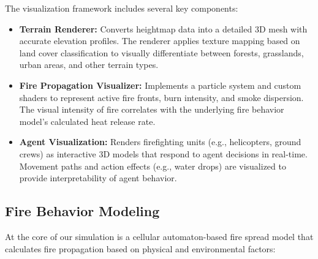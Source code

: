 \documentclass[conference]{IEEEtran}
\begin{document}
\noindent
The visualization framework includes several key components:

\begin{itemize}
    \item \textbf{Terrain Renderer:} Converts heightmap data into a detailed 3D mesh with accurate elevation profiles. The renderer applies texture mapping based on land cover classification to visually differentiate between forests, grasslands, urban areas, and other terrain types.
    
    \item \textbf{Fire Propagation Visualizer:} Implements a particle system and custom shaders to represent active fire fronts, burn intensity, and smoke dispersion. The visual intensity of fire correlates with the underlying fire behavior model's calculated heat release rate.
    
    \item \textbf{Agent Visualization:} Renders firefighting units (e.g., helicopters, ground crews) as interactive 3D models that respond to agent decisions in real-time. Movement paths and action effects (e.g., water drops) are visualized to provide interpretability of agent behavior.
\end{itemize}

\subsection{Fire Behavior Modeling}
At the core of our simulation is a cellular automaton-based fire spread model that calculates fire propagation based on physical and environmental factors:
\end{document}
